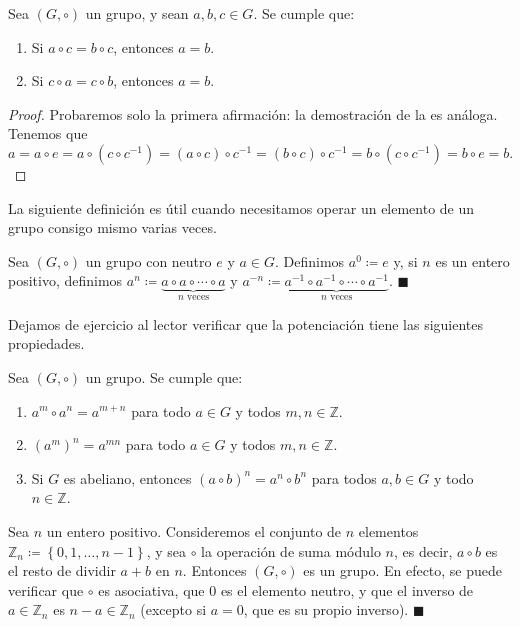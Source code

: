 \begin{proposition} \label{cancelacion_grupos}
	Sea $(G, \circ)$ un grupo, y sean $a, b, c \in G$. Se cumple que:
	\begin{enumerate}
		\item Si $a \circ c = b \circ c$, entonces $a = b$.
		\item Si $c \circ a = c \circ b$, entonces $a = b$.
	\end{enumerate}
\end{proposition}

\begin{proof}
Probaremos solo la primera afirmación: la demostración de la es análoga. Tenemos que
$$a = a \circ e = a \circ \left( c \circ c^{-1} \right) = \left(a \circ c \right) \circ c^{-1} = \left(b \circ c \right) \circ c^{-1} = b \circ \left( c \circ c^{-1} \right) = b \circ e = b.$$
\end{proof}

La siguiente definición es útil cuando necesitamos operar un elemento de un grupo consigo mismo varias veces. 

\begin{definition}
Sea $(G, \circ)$ un grupo con neutro $e$ y $a \in G$. Definimos $a^0 \coloneqq e$ y, si $n$ es un entero positivo, definimos $a^n \coloneqq \underbrace{a \circ a \circ \cdots \circ a}_{n \text{ veces}}$ y $a^{-n} \coloneqq \underbrace{a^{-1} \circ a^{-1} \circ \cdots \circ a^{-1}}_{n \text{ veces}}$. \hfill$\blacksquare$
\end{definition}

Dejamos de ejercicio al lector verificar que la potenciación tiene las siguientes propiedades.

\begin{prop} Sea $(G, \circ)$ un grupo. Se cumple que:
	\begin{enumerate}
		\item $a^m \circ a^n = a^{m+n}$ para todo $a \in G$ y todos $m, n \in \mathbb{Z}$.
		\item $\left( a^m \right)^n = a^{mn}$ para todo $a \in G$ y todos $m, n \in \mathbb{Z}$.
		\item Si $G$ es abeliano, entonces $\left( a \circ b \right)^{n} = a^n \circ b^n$ para todos $a, b \in G$ y todo $n \in \mathbb{Z}$.
	\end{enumerate}
\end{prop}


\begin{example} \label{grupo_ciclico}
Sea $n$ un entero positivo. Consideremos el conjunto de $n$ elementos $\mathbb{Z}_n \coloneq \left\{ 0, 1, \dots, n-1 \right\}$, y sea $\circ$ la operación de suma módulo $n$, es decir, $a \circ b$ es el resto de dividir $a+b$ en $n$. Entonces $(G, \circ)$ es un grupo. En efecto, se puede verificar que $\circ$ es asociativa, que $0$ es el elemento neutro, y que el inverso de $a \in \mathbb{Z}_n$ es $n-a \in \mathbb{Z}_n$ (excepto si $a = 0$, que es su propio inverso). \hfill$\blacksquare$
\end{example}

